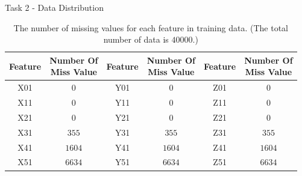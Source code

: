 \documentclass{beamer}
\begin{document}
\begin{frame}{Task 2 - Data Distribution}

  \begin{table}[H]
    \centering
    \begin{tabular}{|c|c|c|c|c|c|}
      \hline
      Feature & \makecell{Number Of                               \\ Miss Value} & Feature & \makecell{Number Of \\ Miss Value} & Feature & \makecell{Number Of \\ Miss Value} \\
      \hline
      X01     & $0$                 & Y01 & $0$    & Z01 & $0$    \\
      \hline
      X11     & $0$                 & Y11 & $0$    & Z11 & $0$    \\
      \hline
      X21     & $0$                 & Y21 & $0$    & Z21 & $0$    \\
      \hline
      X31     & $355$               & Y31 & $355$  & Z31 & $355$  \\
      \hline
      X41     & $1604$              & Y41 & $1604$ & Z41 & $1604$ \\
      \hline
      X51     & $6634$              & Y51 & $6634$ & Z51 & $6634$ \\
      \hline
    \end{tabular}
    \caption{The number of missing values for each feature in training data. (The total number of data is $40000$.)}
  \end{table}

\end{frame}
\end{document}
